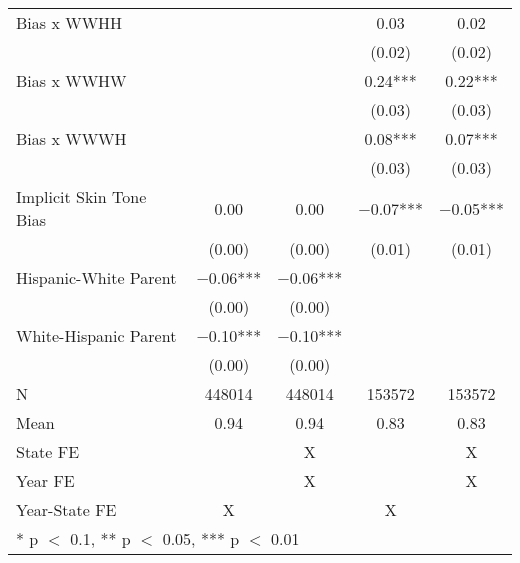 \begin{longtable}[t]{lcccc}
Bias x WWHH &  &  & \num{0.03} & \num{0.02}\\
 &  &  & (\num{0.02}) & (\num{0.02})\\
Bias x WWHW &  &  & \num{0.24}*** & \num{0.22}***\\
 &  &  & (\num{0.03}) & \vphantom{1} (\num{0.03})\\
Bias x WWWH &  &  & \num{0.08}*** & \num{0.07}***\\
 &  &  & (\num{0.03}) & (\num{0.03})\\
Implicit Skin Tone Bias & \num{0.00} & \num{0.00} & \num{-0.07}*** & \num{-0.05}***\\
 & (\num{0.00}) & (\num{0.00}) & (\num{0.01}) & (\num{0.01})\\
Hispanic-White Parent & \num{-0.06}*** & \num{-0.06}*** &  & \\
 & (\num{0.00}) & (\num{0.00}) &  \vphantom{1} & \\
White-Hispanic Parent & \num{-0.10}*** & \num{-0.10}*** &  & \\
 & (\num{0.00}) & (\num{0.00}) &  & \\
\midrule
N & \num{448014} & \num{448014} & \num{153572} & \num{153572}\\
Mean & \num{0.94} & \num{0.94} & \num{0.83} & \num{0.83}\\
State FE &  & X &  & X\\
Year FE &  & X &  & X\\
Year-State FE & X &  & X & \\*
\multicolumn{5}{l}{\rule{0pt}{1em}* p $<$ 0.1, ** p $<$ 0.05, *** p $<$ 0.01}\\
\end{longtable}
